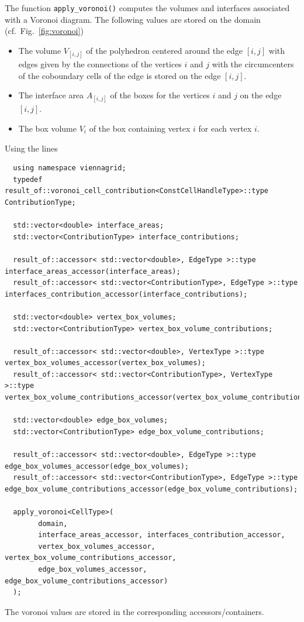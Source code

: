  The function \lstinline|apply_voronoi()| computes the volumes and interfaces associated with a Voronoi diagram. The following values are stored on the domain (cf.~Fig.~\ref{fig:voronoi})
 \begin{itemize}
  \item The volume $V_{[i,j]}$ of the polyhedron centered around the edge $[i,j]$ with edges given by the connections of the vertices $i$ and $j$ with the circumcenters of the coboundary cells of the edge is stored on the edge $[i,j]$.
  \item The interface area $A_{[i,j]}$ of the boxes for the vertices $i$ and $j$ on the edge $[i,j]$.
  \item The box volume $V_i$ of the box containing vertex $i$ for each vertex $i$.
 \end{itemize}
 Using the lines
 \begin{lstlisting}
  using namespace viennagrid;
  typedef result_of::voronoi_cell_contribution<ConstCellHandleType>::type ContributionType;
 
  std::vector<double> interface_areas;
  std::vector<ContributionType> interface_contributions;
  
  result_of::accessor< std::vector<double>, EdgeType >::type interface_areas_accessor(interface_areas);
  result_of::accessor< std::vector<ContributionType>, EdgeType >::type interfaces_contribution_accessor(interface_contributions);
  
  std::vector<double> vertex_box_volumes;
  std::vector<ContributionType> vertex_box_volume_contributions;
  
  result_of::accessor< std::vector<double>, VertexType >::type vertex_box_volumes_accessor(vertex_box_volumes);
  result_of::accessor< std::vector<ContributionType>, VertexType >::type vertex_box_volume_contributions_accessor(vertex_box_volume_contributions);
  
  std::vector<double> edge_box_volumes;
  std::vector<ContributionType> edge_box_volume_contributions;
  
  result_of::accessor< std::vector<double>, EdgeType >::type edge_box_volumes_accessor(edge_box_volumes);
  result_of::accessor< std::vector<ContributionType>, EdgeType >::type edge_box_volume_contributions_accessor(edge_box_volume_contributions);
  
  apply_voronoi<CellType>(
        domain,
        interface_areas_accessor, interfaces_contribution_accessor,
        vertex_box_volumes_accessor, vertex_box_volume_contributions_accessor,
        edge_box_volumes_accessor, edge_box_volume_contributions_accessor)
  );
 \end{lstlisting}
 
 The voronoi values are stored in the corresponding accessors/containers.
